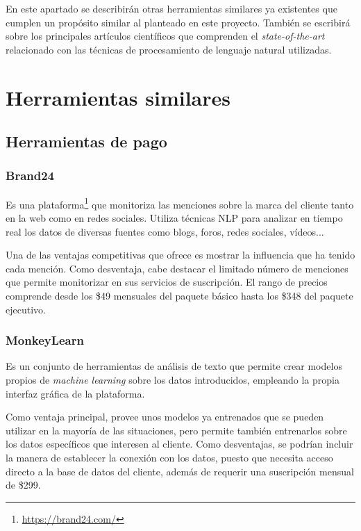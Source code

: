 
En este apartado se describirán otras herramientas similares ya existentes que cumplen un propósito similar al planteado en este proyecto. También se escribirá sobre los principales artículos científicos que comprenden el \textit{state-of-the-art} relacionado con las técnicas de procesamiento de lenguaje natural utilizadas.

\section{Herramientas similares}

\subsection{Herramientas de pago}

\subsubsection{Brand24}

Es una plataforma\footnote{\url{https://brand24.com/}} que monitoriza las menciones sobre la marca del cliente tanto en la web como en redes sociales. Utiliza técnicas NLP para analizar en tiempo real los datos de diversas fuentes como blogs, foros, redes sociales, vídeos...

Una de las ventajas competitivas que ofrece es mostrar la influencia que ha tenido cada mención. Como desventaja, cabe destacar el limitado número de menciones que permite monitorizar en sus servicios de suscripción. El rango de precios comprende desde los \$49 mensuales del paquete básico hasta los \$348 del paquete ejecutivo.

\subsubsection{MonkeyLearn}

Es un conjunto de herramientas de análisis de texto que permite crear modelos propios de \textit{machine learning} sobre los datos introducidos, empleando la propia interfaz gráfica de la plataforma.

Como ventaja principal, provee unos modelos ya entrenados que se pueden utilizar en la mayoría de las situaciones, pero permite también entrenarlos sobre los datos específicos que interesen al cliente. Como desventajas, se podrían incluir la manera de establecer la conexión con los datos, puesto que necesita acceso directo a la base de datos del cliente, además de requerir una suscripción mensual de \$299.

